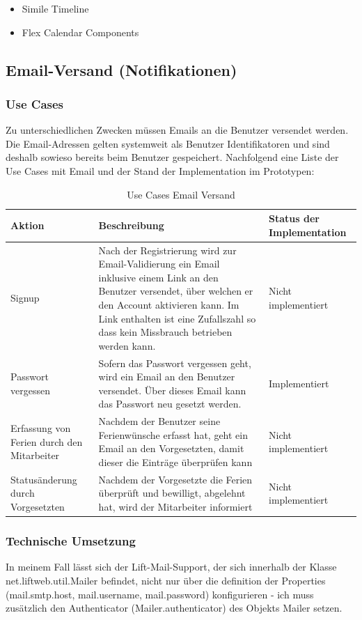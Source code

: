 \begin{itemize}
\item Simile Timeline\cite{simileTimeline}
\item Flex Calendar Components \cite{flexCalendar}
\end{itemize}


\subsection{Email-Versand (Notifikationen)}
\subsubsection{Use Cases}
Zu unterschiedlichen Zwecken m\"ussen  Emails an die Benutzer versendet werden. Die Email-Adressen gelten systemweit als Benutzer Identifikatoren und sind deshalb sowieso bereits beim Benutzer gespeichert. Nachfolgend eine Liste der Use Cases mit Email und der Stand der Implementation im Prototypen:
 \begin{longtable}{|p{3cm}|p{7cm}|p{3cm}|}
      \caption{Use Cases Email Versand}\\
\hline
  \textbf{Aktion} & \textbf{Beschreibung} & \textbf{Status der Implementation}\\
  \hline
  Signup&Nach der Registrierung wird zur Email-Validierung ein Email inklusive einem Link an den Benutzer versendet, \"uber welchen er den Account aktivieren kann. Im Link enthalten ist eine Zufallszahl so dass kein Missbrauch betrieben werden kann. & Nicht implementiert\\
  \hline
  Passwort vergessen&Sofern das Passwort vergessen geht, wird ein Email an den Benutzer versendet. \"Uber dieses Email kann das Passwort neu gesetzt werden. & Implementiert\\
  \hline
  Erfassung von Ferien durch den Mitarbeiter & Nachdem der Benutzer seine Ferienw\"unsche erfasst hat, geht ein Email an den Vorgesetzten, damit dieser die Eintr\"age \"uberpr\"ufen kann & Nicht implementiert \\
  \hline
  Status\"anderung durch Vorgesetzten & Nachdem der Vorgesetzte die Ferien \"uberpr\"uft und bewilligt, abgelehnt hat, wird der Mitarbeiter informiert & Nicht implementiert\\
  \hline
\end{longtable}
 
 \subsubsection{Technische Umsetzung}
 In meinem Fall l\"asst sich der Lift-Mail-Support, der sich innerhalb der Klasse net.liftweb.util.Mailer befindet, nicht nur \"uber die definition der Properties (mail.smtp.host, mail.username, mail.password) konfigurieren - ich muss zus\"atzlich den Authenticator (Mailer.authenticator) des Objekts Mailer setzen.

